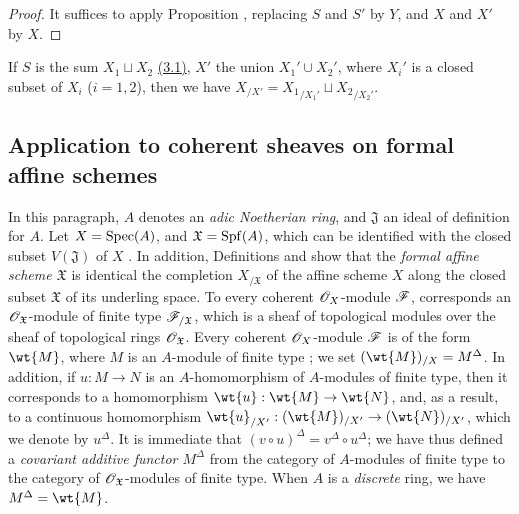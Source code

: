 \begin{proof}
\label{proof-1.10.9.9}
It suffices to apply Proposition , replacing $S$ and $S'$ by $Y$, and $X$ and $X'$ by $X$.
\end{proof}

\begin{rmk}[10.9.10]
\label{1.10.9.10}
If $S$ is the sum $X_1\sqcup X_2$ \hyperref[subsection:1.3.1]{(3.1)}, $X'$ the union $X_1'\cup X_2'$, where $X_i'$ is a closed subset of $X_i$ ($i=1,2$), then we have $X_{/X'}={X_1}_{/X_1'}\sqcup{X_2}_{/X_2'}$.
\end{rmk}

\subsection{Application to coherent sheaves on formal affine schemes}
\label{subsection:1.10.10}

\begin{env}[10.10.1]
\label{1.10.10.1}
In this paragraph, $A$ denotes an \emph{adic Noetherian ring}, and $\mathfrak{J}$ an ideal of definition for $A$.
Let $X=\operatorname{Spec}(A)$, and $\mathfrak{X}=\operatorname{Spf}(A)$, which can be identified with the closed subset $V(\mathfrak{J})$ of $X$ .
In addition, Definitions  and  show that the \emph{formal affine scheme $\mathfrak{X}$} is identical the completion $X_{/\mathfrak{X}}$ of the affine scheme $X$ along the closed subset $\mathfrak{X}$ of its underling space.
To every coherent $\mathscr{O}_X$-module $\mathscr{F}$, corresponds an $\mathscr{O}_\mathfrak{X}$-module of finite type $\mathscr{F}_{/\mathfrak{X}}$, which is a sheaf of topological modules over the sheaf of topological rings $\mathscr{O}_\mathfrak{X}$.
Every coherent $\mathscr{O}_X$-module $\mathscr{F}$ is of the form $\wt{M}$, where $M$ is an $A$-module of finite type ; we set $(\wt{M})_{/X}=M^\Delta$.
In addition, if $u:M\to N$ is an $A$-homomorphism of $A$-modules of finite type, then it corresponds to a homomorphism $\wt{u}:\wt{M}\to\wt{N}$, and, as a result, to a continuous homomorphism $\wt{u}_{/X'}:(\wt{M})_{/X'}\to(\wt{N})_{/X'}$, which we denote by $u^\Delta$.
It is immediate that $(v\circ u)^\Delta=v^\Delta\circ u^\Delta$; we have thus defined a \emph{covariant additive functor $M^\Delta$} from the category of $A$-modules of finite type to the category of $\mathscr{O}_\mathfrak{X}$-modules of finite type.
When $A$ is a \emph{discrete} ring, we have $M^\Delta=\wt{M}$.
\end{env}

